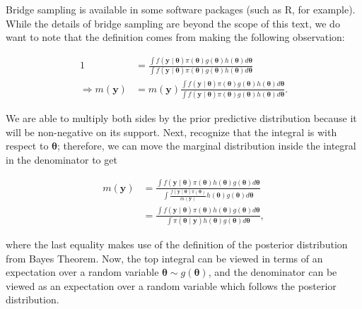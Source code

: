 \documentclass[
  letterpaper,
  DIV=11,
  numbers=noendperiod]{scrreprt}
\theoremstyle{definition}
\theoremstyle{definition}
\theoremstyle{plain}
\theoremstyle{remark}
\begin{document}
Bridge sampling is available in some software packages (such as R, for
example). While the details of bridge sampling are beyond the scope of
this text, we do want to note that the definition comes from making the
following observation:

\[
\begin{aligned}
  1 &= \frac{\int f(\mathbf{y} \mid \boldsymbol{\theta}) \pi(\boldsymbol{\theta}) g(\boldsymbol{\theta}) h(\boldsymbol{\theta})d\boldsymbol{\theta}}{\int f(\mathbf{y} \mid \boldsymbol{\theta}) \pi(\boldsymbol{\theta}) g(\boldsymbol{\theta}) h(\boldsymbol{\theta})d\boldsymbol{\theta}} \\
  \Rightarrow m(\mathbf{y}) &= m(\mathbf{y}) \frac{\int f(\mathbf{y} \mid \boldsymbol{\theta}) \pi(\boldsymbol{\theta}) g(\boldsymbol{\theta}) h(\boldsymbol{\theta})d\boldsymbol{\theta}}{\int f(\mathbf{y} \mid \boldsymbol{\theta}) \pi(\boldsymbol{\theta}) g(\boldsymbol{\theta}) h(\boldsymbol{\theta})d\boldsymbol{\theta}}. 
\end{aligned}
\]

We are able to multiply both sides by the prior predictive distribution
because it will be non-negative on its support. Next, recognize that the
integral is with respect to \(\boldsymbol{\theta}\); therefore, we can
move the marginal distribution inside the integral in the denominator to
get

\[
\begin{aligned}
  m(\mathbf{y}) &= \frac{\int f(\mathbf{y} \mid \boldsymbol{\theta}) \pi(\boldsymbol{\theta}) h(\boldsymbol{\theta}) g(\boldsymbol{\theta})d\boldsymbol{\theta}}{\int \frac{f(\mathbf{y} \mid \boldsymbol{\theta}) \pi(\boldsymbol{\theta})}{m(\mathbf{y})} h(\boldsymbol{\theta}) g(\boldsymbol{\theta})d\boldsymbol{\theta}} \\
    &= \frac{\int f(\mathbf{y} \mid \boldsymbol{\theta}) \pi(\boldsymbol{\theta}) h(\boldsymbol{\theta}) g(\boldsymbol{\theta})d\boldsymbol{\theta}}{\int \pi(\boldsymbol{\theta} \mid \mathbf{y}) h(\boldsymbol{\theta}) g(\boldsymbol{\theta})d\boldsymbol{\theta}},
\end{aligned}
\]

where the last equality makes use of the definition of the posterior
distribution from Bayes Theorem. Now, the top integral can be viewed in
terms of an expectation over a random variable
\(\boldsymbol{\theta} \sim g(\boldsymbol{\theta})\), and the denominator
can be viewed as an expectation over a random variable which follows the
posterior distribution.
\end{document}

